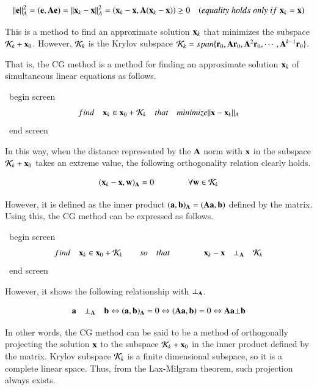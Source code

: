 \begin{equation}
||\mathbf{e}||_A^2=(\mathbf{e},\mathbf{A}\mathbf{e})=||\mathbf{x}_k-\mathbf{x}||_A^2=\left(\mathbf{x}_k-\mathbf{x},\mathbf{A}(\mathbf{x}_k-\mathbf{x})\right)\ge0\quad(equality\;holds\;only\;if\;\mathbf{x}_k=\mathbf{x})
\end{equation}

This is a method to find an approximate solution $\mathbf{x}_k$ that minimizes the subspace ${\cal K}_k+\mathbf{x}_0$. However, ${\cal K}_k$ is the Krylov subspace $\mathbf{\cal K}_k=span\{\mathbf{r}_0,\mathbf{A}\mathbf{r}_0,\mathbf{A}^2\mathbf{r}_0,\cdots,\mathbf{A}^{k-1}\mathbf{r}_0\}$.

That is, the CG method is a method for finding an approximate solution $\mathbf{x}_k$ of simultaneous linear equations as follows.

\ begin {screen}
\begin{equation}
find \quad \mathbf{x}_k\in\mathbf{x}_0+\mathbf{\cal K}_k\quad that \quad minimize ||\mathbf{x}-\mathbf{x}_k||_A
\end{equation}
\ end {screen}

In this way, when the distance represented by the $\mathbf{A}$ norm with $\mathbf{x}$ in the subspace ${\cal K}_k+\mathbf{x}_0$ takes an extreme value, the following orthogonality relation clearly holds.

\begin{equation}
(\mathbf{x}_k-\mathbf{x},\mathbf{w})_{\mathbf{A}} = 0 \qquad \qquad \forall\mathbf{w}\in{\cal K}_k
\end{equation}


However, it is defined as the inner product $(\mathbf{a},\mathbf{b})_{\mathbf{A}}=(\mathbf{A}\mathbf{a},\mathbf{b})$ defined by the matrix. Using this, the CG method can be expressed as follows.

\ begin {screen}
\begin{equation}
find \quad \mathbf{x}_k\in\mathbf{x}_0+{\cal K}_k \qquad so \quad that \qquad \qquad \mathbf{x}_k-\mathbf{x}\quad\bot_{\mathbf{A}}\quad{\cal K}_k
\end{equation}
\ end {screen}

However, it shows the following relationship with $\bot_{\mathbf{A}}$.

\begin{equation}
\mathbf{a}\quad\bot_{\mathbf{A}}\quad\mathbf{b} \Leftrightarrow (\mathbf{a},\mathbf{b})_{\mathbf{A}}=0 \Leftrightarrow (\mathbf{A}\mathbf{a},\mathbf{b})=0\Leftrightarrow \mathbf{A}\mathbf{a} \bot \mathbf{b}
\end{equation}


In other words, the CG method can be said to be a method of orthogonally projecting the solution $\mathbf{x}$ to the subspace ${\cal K}_k+\mathbf{x}_0$ in the inner product defined by the matrix. Krylov subspace ${\cal K}_k$ is a finite dimensional subspace, so it is a complete linear space. Thus, from the Lax-Milgram theorem, such projection always exists.


